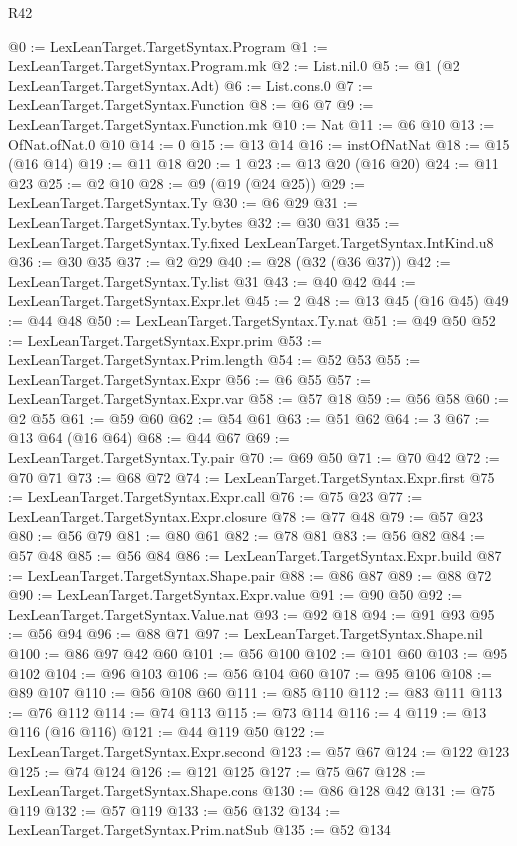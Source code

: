 \begin{lexlean}{R42}
\begin{coremodule}
{{{{{{{{{{{{{{{{{@0 := LexLeanTarget.TargetSyntax.Program
@1 := LexLeanTarget.TargetSyntax.Program.mk
@2 := List.nil.{0}
@5 := @1 (@2 LexLeanTarget.TargetSyntax.Adt)
@6 := List.cons.{0}
@7 := LexLeanTarget.TargetSyntax.Function
@8 := @6 @7
@9 := LexLeanTarget.TargetSyntax.Function.mk
@10 := Nat
@11 := @6 @10
@13 := OfNat.ofNat.{0} @10
@14 := 0
@15 := @13 @14
@16 := instOfNatNat
@18 := @15 (@16 @14)
@19 := @11 @18
@20 := 1
@23 := @13 @20 (@16 @20)
@24 := @11 @23
@25 := @2 @10
@28 := @9 (@19 (@24 @25))
@29 := LexLeanTarget.TargetSyntax.Ty
@30 := @6 @29
@31 := LexLeanTarget.TargetSyntax.Ty.bytes
@32 := @30 @31
@35 := LexLeanTarget.TargetSyntax.Ty.fixed LexLeanTarget.TargetSyntax.IntKind.u8
@36 := @30 @35
@37 := @2 @29
@40 := @28 (@32 (@36 @37))
@42 := LexLeanTarget.TargetSyntax.Ty.list @31
@43 := @40 @42
@44 := LexLeanTarget.TargetSyntax.Expr.let
@45 := 2
@48 := @13 @45 (@16 @45)
@49 := @44 @48
@50 := LexLeanTarget.TargetSyntax.Ty.nat
@51 := @49 @50
@52 := LexLeanTarget.TargetSyntax.Expr.prim
@53 := LexLeanTarget.TargetSyntax.Prim.length
@54 := @52 @53
@55 := LexLeanTarget.TargetSyntax.Expr
@56 := @6 @55
@57 := LexLeanTarget.TargetSyntax.Expr.var
@58 := @57 @18
@59 := @56 @58
@60 := @2 @55
@61 := @59 @60
@62 := @54 @61
@63 := @51 @62
@64 := 3
@67 := @13 @64 (@16 @64)
@68 := @44 @67
@69 := LexLeanTarget.TargetSyntax.Ty.pair
@70 := @69 @50
@71 := @70 @42
@72 := @70 @71
@73 := @68 @72
@74 := LexLeanTarget.TargetSyntax.Expr.first
@75 := LexLeanTarget.TargetSyntax.Expr.call
@76 := @75 @23
@77 := LexLeanTarget.TargetSyntax.Expr.closure
@78 := @77 @48
@79 := @57 @23
@80 := @56 @79
@81 := @80 @61
@82 := @78 @81
@83 := @56 @82
@84 := @57 @48
@85 := @56 @84
@86 := LexLeanTarget.TargetSyntax.Expr.build
@87 := LexLeanTarget.TargetSyntax.Shape.pair
@88 := @86 @87
@89 := @88 @72
@90 := LexLeanTarget.TargetSyntax.Expr.value
@91 := @90 @50
@92 := LexLeanTarget.TargetSyntax.Value.nat
@93 := @92 @18
@94 := @91 @93
@95 := @56 @94
@96 := @88 @71
@97 := LexLeanTarget.TargetSyntax.Shape.nil
@100 := @86 @97 @42 @60
@101 := @56 @100
@102 := @101 @60
@103 := @95 @102
@104 := @96 @103
@106 := @56 @104 @60
@107 := @95 @106
@108 := @89 @107
@110 := @56 @108 @60
@111 := @85 @110
@112 := @83 @111
@113 := @76 @112
@114 := @74 @113
@115 := @73 @114
@116 := 4
@119 := @13 @116 (@16 @116)
@121 := @44 @119 @50
@122 := LexLeanTarget.TargetSyntax.Expr.second
@123 := @57 @67
@124 := @122 @123
@125 := @74 @124
@126 := @121 @125
@127 := @75 @67
@128 := LexLeanTarget.TargetSyntax.Shape.cons
@130 := @86 @128 @42
@131 := @75 @119
@132 := @57 @119
@133 := @56 @132
@134 := LexLeanTarget.TargetSyntax.Prim.natSub
@135 := @52 @134
}}}}}}}}}}}}}}}}}
\end{coremodule}
\end{lexlean}
